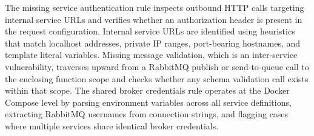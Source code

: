 \documentclass[preprint,12pt]{elsarticle}
\begin{document}
The missing service authentication rule inspects outbound HTTP calls targeting internal service URLs and verifies whether an authorization header is present in the request configuration. Internal service URLs are identified using heuristics that match localhost addresses, private IP ranges, port-bearing hostnames, and template literal variables. Missing message validation, which is an inter-service vulnerability, traverses upward from a RabbitMQ publish or send-to-queue call to the enclosing function scope and checks whether any schema validation call exists within that scope. The shared broker credentials rule operates at the Docker Compose level by parsing environment variables across all service definitions, extracting RabbitMQ usernames from connection strings, and flagging cases where multiple services share identical broker credentials.
\end{document}
